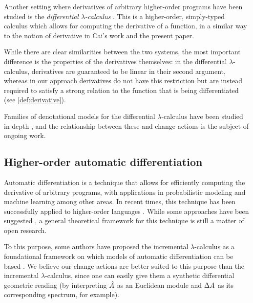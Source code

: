 Another setting where derivatives of arbitrary higher-order programs have been studied
is the \emph{differential $\lambda$-calculus} \autocites{ehrhard2003differential}{ehrhard2017introduction}.
This is a higher-order, simply-typed
calculus which allows for computing the derivative of a function, in a similar
way to the notion of derivative in Cai's work and the present paper.

While there are clear similarities between the two systems, 
the most important difference is the properties of the derivatives themselves:
in the differential $\lambda$-calculus, derivatives are guaranteed to be linear
in their second argument, whereas in our approach derivatives do not have this restriction 
but are instead required to satisfy a strong relation to the function
that is being differentiated (see \cref{def:derivative}).

Families of denotational models for the differential $\lambda$-calculus have been
studied in depth
\autocites{bucciarelli2010categorical}{blute2010convenient}{cockett2016categorical}{kerjean2016mackey},
and the relationship between these and change actions is the subject of ongoing work.

\subsection{Higher-order automatic differentiation}

Automatic differentiation \autocite{griewank2008evaluating} is a technique that allows
for efficiently computing the derivative of arbitrary programs, with
applications in probabilistic modeling \autocite{kucukelbir2017automatic}
and machine learning \autocite{baydin2014automatic} among other areas. In recent times, this technique has been successfully
applied to higher-order languages \autocites{siskind2008nesting}{baydin2016diffsharp}.
While some approaches have been suggested \autocites{manzyuk2012simply}{kelly2016evolving}, a general
theoretical framework for this technique is still a matter of open research. 

To this purpose, some authors have proposed the incremental $\lambda$-calculus
as a foundational framework on which models of automatic differentiation can
be based \autocite{kelly2016evolving}. We believe our change actions are better suited
to this purpose than the incremental $\lambda$-calculus, since one can easily give them a
synthetic differential geometric reading (by interpreting $\hat{A}$ as an Euclidean module and $\Delta A$
as its corresponding spectrum, for example).

